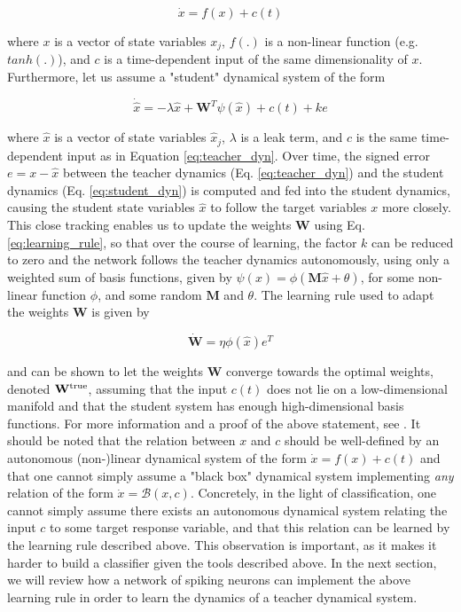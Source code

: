 \documentclass[twoside,11pt,titlepage]{article}
\begin{document}
\begin{equation} \label{eq:teacher_dyn}
  \dot{x} = f(x) + c(t)
\end{equation}

where $x$ is a vector of state variables $x_j$, $f(.)$ is a non-linear function (e.g. $tanh(.)$), and $c$ is a time-dependent input of the same dimensionality of $x$.
Furthermore, let us assume a "student" dynamical system of the form

\begin{equation} \label{eq:student_dyn}
  \dot{\hat{x}} = -\lambda \hat{x} + \mathbf{W}^T \psi(\hat{x}) + c(t) + ke
\end{equation}

where $\hat{x}$ is a vector of state variables $\hat{x}_j$, $\lambda$ is a leak term, and $c$ is the same time-dependent input as in Equation \ref{eq:teacher_dyn}.
Over time, the signed error $e = x - \hat{x}$ between the teacher dynamics (Eq. \ref{eq:teacher_dyn}) and the student dynamics (Eq. \ref{eq:student_dyn}) is computed
and fed into the student dynamics, causing the student state variables $\hat{x}$ to follow the target variables $x$ more closely. This close tracking enables
us to update the weights $\mathbf{W}$ using Eq. \ref{eq:learning_rule}, so that over the course of learning, the factor $k$ can be reduced to zero and the network follows the teacher dynamics
autonomously, using only a weighted sum of basis functions, given by $\psi(x)=\phi(\mathbf{M}\hat{x}+\theta)$, for some non-linear function $\phi$, and some random $\mathbf{M}$ and $\theta$.
The learning rule used to adapt the weights $\mathbf{W}$ is given by

\begin{equation} \label{eq:learning_rule}
  \dot{\mathbf{W}} = \eta \phi(\hat{x})e^T
\end{equation}

and can be shown to let the weights $\mathbf{W}$ converge towards the optimal weights, denoted $\mathbf{W}^\textnormal{true}$, assuming that the input $c(t)$ does not lie on a
low-dimensional manifold and that the student system has enough high-dimensional basis functions. For more information and a proof of the above statement, see \cite{alemi2017learning}.
It should be noted that the relation between $x$ and $c$ should be well-defined by an autonomous (non-)linear dynamical system of the form $\dot{x} = f(x)+c(t)$ and that one cannot
simply assume a "black box" dynamical system implementing \textit{any} relation of the form $\dot{x} = \mathcal{B}(x,c)$. Concretely, in the light of classification, one cannot simply
assume there exists an autonomous dynamical system relating the input $c$ to some target response variable, and that this relation can be learned by the learning rule described above.
This observation is important, as it makes it harder to build a classifier given the tools described above. In the next section, we will review how a network of spiking neurons can
implement the above learning rule in order to learn the dynamics of a teacher dynamical system.
\end{document}

